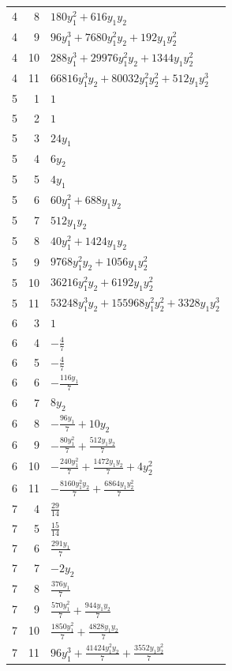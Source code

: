 \documentclass[10pt,a4paper]{article}
\begin{document}
{\begin{longtable}{rrp{125mm}}
4 & 8 & $180 y_{1}^{2} + 616 y_{1} y_{2}$\\
4 & 9 & $96 y_{1}^{3} + 7680 y_{1}^{2} y_{2} + 192 y_{1} y_{2}^{2}$\\
4 & 10 & $288 y_{1}^{3} + 29976 y_{1}^{2} y_{2} + 1344 y_{1} y_{2}^{2}$\\
4 & 11 & $66816 y_{1}^{3} y_{2} + 80032 y_{1}^{2} y_{2}^{2} + 512 y_{1} y_{2}^{3}$\\
5 & 1 & $1$\\
5 & 2 & $1$\\
5 & 3 & $24 y_{1}$\\
5 & 4 & $6 y_{2}$\\
5 & 5 & $4 y_{1}$\\
5 & 6 & $60 y_{1}^{2} + 688 y_{1} y_{2}$\\
5 & 7 & $512 y_{1} y_{2}$\\
5 & 8 & $40 y_{1}^{2} + 1424 y_{1} y_{2}$\\
5 & 9 & $9768 y_{1}^{2} y_{2} + 1056 y_{1} y_{2}^{2}$\\
5 & 10 & $36216 y_{1}^{2} y_{2} + 6192 y_{1} y_{2}^{2}$\\
5 & 11 & $53248 y_{1}^{3} y_{2} + 155968 y_{1}^{2} y_{2}^{2} + 3328 y_{1} y_{2}^{3}$\\
6 & 3 & $1$\\
6 & 4 & $- \frac{4}{7}$\\
6 & 5 & $- \frac{4}{7}$\\
6 & 6 & $- \frac{116 y_{1}}{7}$\\
6 & 7 & $8 y_{2}$\\
6 & 8 & $- \frac{96 y_{1}}{7} + 10 y_{2}$\\
6 & 9 & $- \frac{80 y_{1}^{2}}{7} + \frac{512 y_{1} y_{2}}{7}$\\
6 & 10 & $- \frac{240 y_{1}^{2}}{7} + \frac{1472 y_{1} y_{2}}{7} + 4 y_{2}^{2}$\\
6 & 11 & $- \frac{8160 y_{1}^{2} y_{2}}{7} + \frac{6864 y_{1} y_{2}^{2}}{7}$\\
7 & 4 & $\frac{29}{14}$\\
7 & 5 & $\frac{15}{14}$\\
7 & 6 & $\frac{291 y_{1}}{7}$\\
7 & 7 & $- 2 y_{2}$\\
7 & 8 & $\frac{376 y_{1}}{7}$\\
7 & 9 & $\frac{570 y_{1}^{2}}{7} + \frac{944 y_{1} y_{2}}{7}$\\
7 & 10 & $\frac{1850 y_{1}^{2}}{7} + \frac{4828 y_{1} y_{2}}{7}$\\
7 & 11 & $96 y_{1}^{3} + \frac{41424 y_{1}^{2} y_{2}}{7} + \frac{3552 y_{1} y_{2}^{2}}{7}$\\

\end{longtable}}
\end{document}
